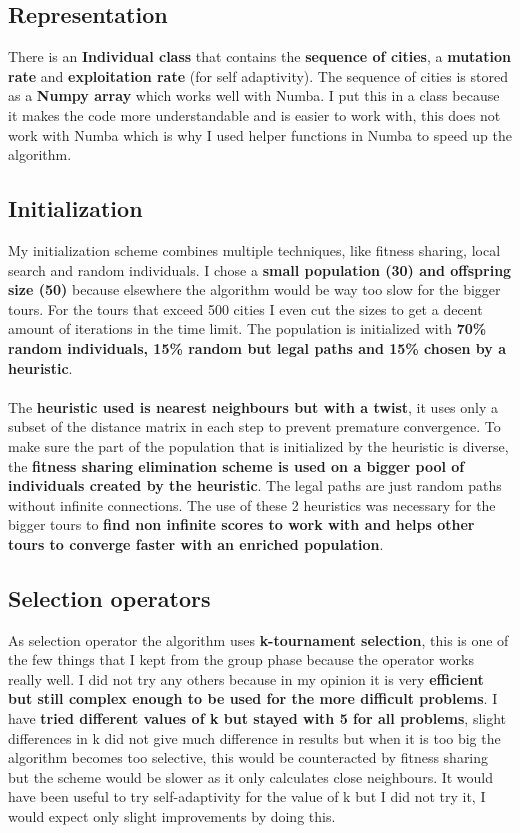 \documentclass[a4paper,10pt]{article}
\begin{document}
\clearpage

\subsection{Representation}
There is an \textbf{Individual class} that contains the \textbf{sequence of cities}, a \textbf{mutation rate} and \textbf{exploitation rate} (for self adaptivity). The sequence of cities is stored as a \textbf{Numpy array} which works well with Numba. I put this in a class because it makes the code more understandable and is easier to work with, this does not work with Numba which is why I used helper functions in Numba to speed up the algorithm.

\subsection{Initialization}
\label{init}
My initialization scheme combines multiple techniques, like fitness sharing, local search and random individuals. I chose a \textbf{small population (30) and offspring size (50)} because elsewhere the algorithm would be way too slow for the bigger tours. For the tours that exceed 500 cities I even cut the sizes to get a decent amount of iterations in the time limit. The population is initialized with \textbf{70\% random individuals, 15\% random but legal paths and 15\% chosen by a heuristic}. 
\\\\
The \textbf{heuristic used is nearest neighbours but with a twist}, it uses only a subset of the distance matrix in each step to prevent premature convergence. To make sure the part of the population that is initialized by the heuristic is diverse, the \textbf{fitness sharing elimination scheme is used on a bigger pool of individuals created by the heuristic}. The legal paths are just random paths without infinite connections. The use of these 2 heuristics was necessary for the bigger tours to \textbf{find non infinite scores to work with and helps other tours to converge faster with an enriched population}.

\subsection{Selection operators}
As selection operator the algorithm uses \textbf{k-tournament selection}, this is one of the few things that I kept from the group phase because the operator works really well. I did not try any others because in my opinion it is very \textbf{efficient but still complex enough to be used for the more difficult problems}. I have \textbf{tried different values of k but stayed with 5 for all problems}, slight differences in k did not give much difference in results but when it is too big the algorithm becomes too selective, this would be counteracted by fitness sharing but the scheme would be slower as it only calculates close neighbours. It would have been useful to try self-adaptivity for the value of k but I did not try it, I would expect only slight improvements by doing this.
\end{document}
